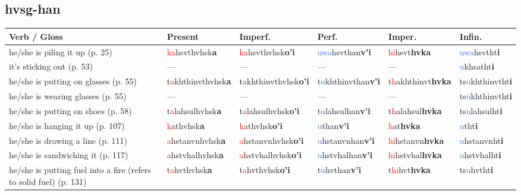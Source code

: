 \documentclass[oneside,openany]{book}%
\begin{document}
\subsection*{hvsg-han}%
\begin{tabularx}{\textwidth}{>{\hsize=1.5\hsize\RaggedRight}X >{\hsize=0.9\hsize}X >{\hsize=0.9\hsize}X >{\hsize=0.9\hsize}X >{\hsize=0.9\hsize}X >{\hsize=0.9\hsize}X}%
\toprule%
\textbf{Verb / Gloss}&\textbf{Present}&\textbf{Imperf.}&\textbf{Perf.}&\textbf{Imper.}&\textbf{Infin.}\\%
\midrule%
he/she is piling it up (p. 25)&\textcolor{Red}{ka}hsvthvhsk\textbf{a}&\textcolor{Red}{ka}hsvthvhsk\textbf{o'i}&\textcolor{RoyalBlue}{uwa}hsvthan\textbf{v'i}&\textcolor{Red}{hi}hsvt\textbf{hvka}&\textcolor{RoyalBlue}{uwa}hsvtht\textbf{i}\\%
it's sticking out (p. 53)&---&---&---&---&\textcolor{RoyalBlue}{u}khsatht\textbf{i}\\%
he/she is putting on glasses (p. 55)&t\textcolor{Red}{a}khthinvthvhsk\textbf{a}&t\textcolor{Red}{a}khthinvthvhsk\textbf{o'i}&t\textcolor{RoyalBlue}{u}khthinvthan\textbf{v'i}&t\textcolor{Red}{h}akhthinvt\textbf{hvka}&ts\textcolor{RoyalBlue}{u}khthinvtht\textbf{i}\\%
he/she is wearing glasses (p. 55)&---&---&---&---&ts\textcolor{RoyalBlue}{u}khthinvtht\textbf{i}\\%
he/she is putting on shoes (p. 58)&t\textcolor{Red}{a}lahsulhvhsk\textbf{a}&t\textcolor{Red}{a}lahsulhvhsk\textbf{o'i}&t\textcolor{RoyalBlue}{u}lahsulhan\textbf{v'i}&t\textcolor{Red}{h}alahsul\textbf{hvka}&ts\textcolor{RoyalBlue}{u}lahsulht\textbf{i}\\%
he/she is hanging it up (p. 107)&\textcolor{Red}{k}athvhsk\textbf{a}&\textcolor{Red}{k}athvhsk\textbf{o'i}&\textcolor{RoyalBlue}{u}than\textbf{v'i}&\textcolor{Red}{h}at\textbf{hvka}&\textcolor{RoyalBlue}{u}tht\textbf{i}\\%
he/she is drawing a line (p. 111)&\textcolor{Red}{a}hstanvnhvhsk\textbf{a}&\textcolor{Red}{a}hstanvnhvhsk\textbf{o'i}&\textcolor{RoyalBlue}{u}hstanvnhan\textbf{v'i}&\textcolor{Red}{hi}hstanvn\textbf{hvka}&\textcolor{RoyalBlue}{u}hstanvnht\textbf{i}\\%
he/she is sandwiching it (p. 117)&\textcolor{Red}{a}hstvhalhvhsk\textbf{a}&\textcolor{Red}{a}hstvhalhvhsk\textbf{o'i}&\textcolor{RoyalBlue}{u}hstvhalhan\textbf{v'i}&\textcolor{Red}{hi}hstvhal\textbf{hvka}&\textcolor{RoyalBlue}{u}hstvhalht\textbf{i}\\%
he/she is putting fuel into a fire (refers to solid fuel) (p. 131)&t\textcolor{Red}{a}hvthvhsk\textbf{a}&t\textcolor{Red}{a}hvthvhsk\textbf{o'i}&t\textcolor{RoyalBlue}{u}hvthan\textbf{v'i}&t\textcolor{Red}{hi}hvt\textbf{hvka}&ts\textcolor{RoyalBlue}{u}hvtht\textbf{i}\\%

\end{tabularx}
\end{document}
